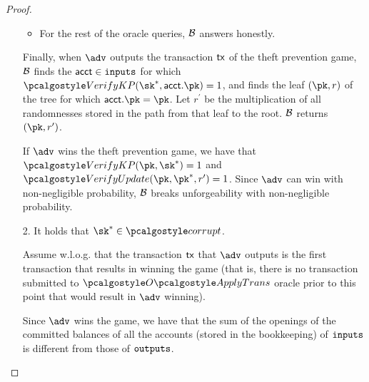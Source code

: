 \begin{proof}
\begin{itemize}
\begin{itemize}
        \item For the rest of the oracle queries, $\mathcal{B}$ answers honestly.
    \end{itemize}
    Finally, when $\adv$ outputs the transaction $\textup{\textsf{tx}}$ of the theft prevention game, $\mathcal{B}$ finds the $\textup{\textsf{acct}}\in {\textup{\texttt{inputs}}}$ for which $\verkp(\sk^*, \acct.\pk)=1$, and finds the leaf $(\pk, r)$ of the tree for which $\acct.\pk = \pk$. Let $r^\prime$ be the multiplication of all randomnesses stored in the path from that leaf to the root. $\mathcal{B}$ returns $(\pk, r^\prime)$.
    

    If $\adv$ wins the theft prevention game, we have that $\verkp(\pk, \sk^*) = 1$ and $\verupd(\pk, \pk^*, r^\prime)=1$. Since $\adv$ can win with non-negligible probability, $\mathcal{B}$ breaks unforgeability with non-negligible probability.


    \item[2.] It holds that $\sk^*\in \corrupt$. 
    
    Assume w.l.o.g. that the transaction $\textup{\textsf{tx}}$ that $\adv$ outputs is the first transaction that results in winning the game (that is, there is no transaction submitted to $\applytxnOracle$ oracle prior to this point that would result in $\adv$ winning).

    Since $\adv$ wins the game, we have that the sum of the openings of the committed balances of all the accounts (stored in the bookkeeping) of ${\textup{\texttt{inputs}}}$ is different from those of ${\textup{\texttt{outputs}}}$. 
    



\end{itemize}
\end{proof}

